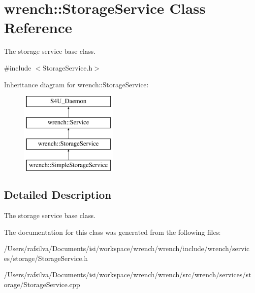 \hypertarget{classwrench_1_1_storage_service}{}\section{wrench\+:\+:Storage\+Service Class Reference}
\label{classwrench_1_1_storage_service}


The storage service base class.  




{\ttfamily \#include $<$Storage\+Service.\+h$>$}

Inheritance diagram for wrench\+:\+:Storage\+Service\+:\begin{figure}[H]
\begin{center}
\leavevmode
\includegraphics[height=4.000000cm]{classwrench_1_1_storage_service}
\end{center}
\end{figure}


\subsection{Detailed Description}
The storage service base class. 

The documentation for this class was generated from the following files\+:\begin{DoxyCompactItemize}
\item 
/\+Users/rafsilva/\+Documents/isi/workspace/wrench/wrench/include/wrench/services/storage/Storage\+Service.\+h\item 
/\+Users/rafsilva/\+Documents/isi/workspace/wrench/wrench/src/wrench/services/storage/Storage\+Service.\+cpp\end{DoxyCompactItemize}
